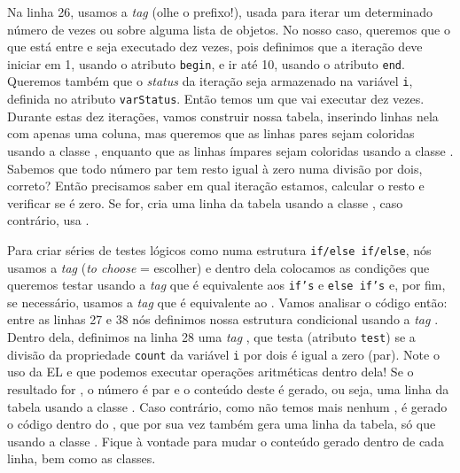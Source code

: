 Na linha 26, usamos a \textit{tag}  (olhe o prefixo!), usada para iterar um determinado número de vezes ou sobre alguma lista de objetos. No nosso caso, queremos que o que está entre  e  seja executado dez vezes, pois definimos que a iteração deve iniciar em 1, usando o atributo \texttt{begin}, e ir até 10, usando o atributo \texttt{end}. Queremos também que o \textit{status} da iteração seja armazenado na variável \texttt{i}, definida no atributo \texttt{varStatus}. Então temos um  que vai executar dez vezes. Durante estas dez iterações, vamos construir nossa tabela, inserindo linhas nela com apenas uma coluna, mas queremos que as linhas pares sejam coloridas usando a classe , enquanto que as linhas ímpares sejam coloridas usando a classe . Sabemos que todo número par tem resto igual à zero numa divisão por dois, correto? Então precisamos saber em qual iteração estamos, calcular o resto e verificar se é zero. Se for, cria uma linha da tabela usando a classe , caso contrário, usa .

Para criar séries de testes lógicos como numa estrutura \texttt{if/else if/else}, nós usamos a \textit{tag}  (\textit{to choose} = escolher) e dentro dela colocamos as condições que queremos testar usando a \textit{tag}  que é equivalente aos \texttt{if’s} e \texttt{else if’s} e, por fim, se necessário, usamos a \textit{tag}  que é equivalente ao . Vamos analisar o código então: entre as linhas 27 e 38 nós definimos nossa estrutura condicional usando a \textit{tag} . Dentro dela, definimos na linha 28 uma \textit{tag} , que testa (atributo \texttt{test}) se a divisão da propriedade \texttt{count} da variável \texttt{i} por dois é igual a zero (par). Note o uso da EL e que podemos executar operações aritméticas dentro dela! Se o resultado for , o número é par e o conteúdo deste  é gerado, ou seja, uma linha da tabela usando a classe . Caso contrário, como não temos mais nenhum , é gerado o código dentro do , que por sua vez também gera uma linha da tabela, só que usando a classe . Fique à vontade para mudar o conteúdo gerado dentro de cada linha, bem como as classes.

